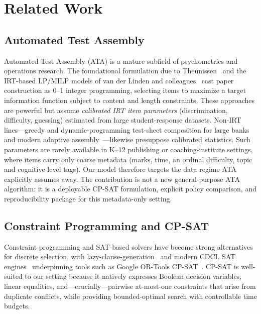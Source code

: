 \documentclass[runningheads]{llncs}
\begin{document}
\section{Related Work}
\label{sec:related}

\subsection{Automated Test Assembly}
Automated Test Assembly (ATA) is a mature subfield of psychometrics and operations research.
The foundational formulation due to Theunissen~\cite{theunissen1985} and the IRT-based LP/MILP models of van der Linden and colleagues~\cite{vanderLinden2005,vanderLinden1989,lord1980} cast paper construction as 0--1 integer programming, selecting items to maximize a target information function subject to content and length constraints.
These approaches are powerful but assume \emph{calibrated IRT item parameters} (discrimination, difficulty, guessing) estimated from large student-response datasets.
Non-IRT lines---greedy and dynamic-programming test-sheet composition for large banks~\cite{hwang2006} and modern adaptive assembly~\cite{vanderLinden2010}---likewise presuppose calibrated statistics.
Such parameters are rarely available in K--12 publishing or coaching-institute settings, where items carry only coarse metadata (marks, time, an ordinal difficulty, topic and cognitive-level tags).
Our model therefore targets the data regime ATA explicitly assumes away.
The contribution is not a new general-purpose ATA algorithm: it is a deployable CP-SAT formulation, explicit policy comparison, and reproducibility package for this metadata-only setting.

\subsection{Constraint Programming and CP-SAT}
Constraint programming and SAT-based solvers have become strong alternatives for discrete selection, with lazy-clause-generation~\cite{nieuwenhuis2006} and modern CDCL SAT engines~\cite{biere2009} underpinning tools such as Google OR-Tools CP-SAT~\cite{ortools,perron2023}.
CP-SAT is well-suited to our setting because it natively expresses Boolean decision variables, linear equalities, and---crucially---pairwise at-most-one constraints that arise from duplicate conflicts, while providing bounded-optimal search with controllable time budgets.
\end{document}
